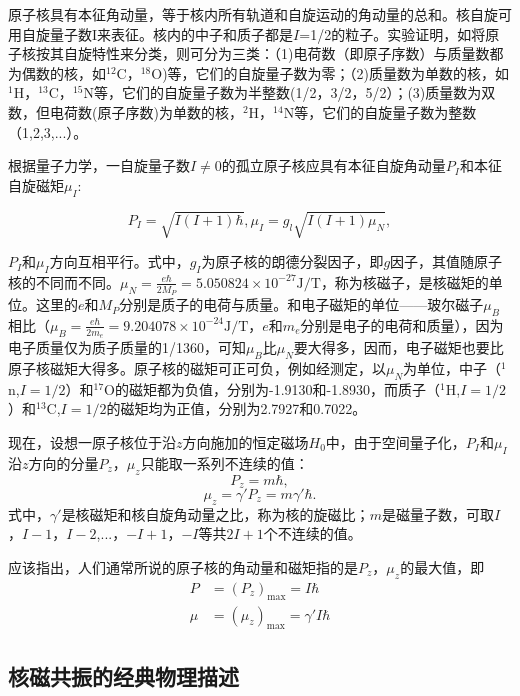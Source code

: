 \documentclass{buaaemp}
\begin{document}
原子核具有本征角动量，等于核内所有轨道和自旋运动的角动量的总和。核自旋可用自旋量子数I来表征。核内的中子和质子都是$I$=1/2的粒子。实验证明，如将原子核按其自旋特性来分类，则可分为三类：（1)电荷数（即原子序数）与质量数都为偶数的核，如$^{12}$C，$^{18}$O)等，它们的自旋量子数为零；（2)质量数为单数的核，如$^1$H，$^{13}$C，$^{15}$N等，它们的自旋量子数为半整数(1/2，3/2，5/2）；(3)质量数为双数，但电荷数(原子序数)为单数的核，$^2$H，$^{14}$N等，它们的自旋量子数为整数（1,2,3,...）。
\newpage

根据量子力学，一自旋量子数$I\neq0$的孤立原子核应具有本征自旋角动量$P_I$和本征自旋磁矩$\mu_I$:

$$P_I=\sqrt{I(I+1)\hbar},\mu_I=g_l\sqrt{I(I+1)\mu_N},$$

$P_I$和$\mu_I$方向互相平行。式中，$g_I$为原子核的朗德分裂因子，即$g$因子，其值随原子核的不同而不同。$\mu_N=\frac{e\hbar}{2M_P}=5.050824\times 10^{-27}\text{J/T}$，称为核磁子，是核磁矩的单位。这里的$e$和$M_P$分别是质子的电荷与质量。和电子磁矩的单位——玻尔磁子$\mu_B$相比（$\mu_B=\frac{e\hbar}{2m_e}=9.204078\times 10^{-24}\text{J/T}$，$e$和$m_e$分别是电子的电荷和质量），因为电子质量仅为质子质量的1/1360，可知$\mu_B$比$\mu_N$要大得多，因而，电子磁矩也要比原子核磁矩大得多。原子核的磁矩可正可负，例如经测定，以$\mu_N$为单位，中子（$^1$n,$I=1/2$）和$^{17}$O的磁矩都为负值，分别为-1.9130和-1.8930，而质子（$^{1}$H,$I=1/2$）和$^{13}\text{C}$,$I=1/2$的磁矩均为正值，分别为2.7927和0.7022。

现在，设想一原子核位于沿$z$方向施加的恒定磁场$H_0$中，由于空间量子化，$P_I$和$\mu_I$沿$z$方向的分量$P_z$，$\mu_z$只能取一系列不连续的值：
$$P_z=m\hbar,$$
$$\mu_z=\gamma'P_z=m\gamma'\hbar.$$
式中，$\gamma'$是核磁矩和核自旋角动量之比，称为核的旋磁比；$m$是磁量子数，可取$I$，$I-1$，$I-2$,...，$-I+1$，$-I$等共$2I+1$个不连续的值。

应该指出，人们通常所说的原子核的角动量和磁矩指的是$P_z$，$\mu_z$的最大值，即
\begin{align*}
    P&=(P_z)_\text{max}=I\hbar \\
    \mu&=(\mu_z)_\text{max}=\gamma'I\hbar
\end{align*}


\subsection{核磁共振的经典物理描述}
\end{document}
